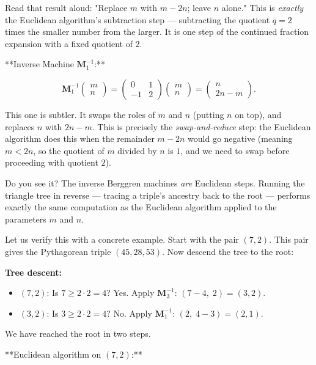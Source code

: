 Read that result aloud: "Replace $m$ with $m - 2n$; leave $n$ alone." This is \textit{exactly} the Euclidean algorithm's subtraction step --- subtracting the quotient $q = 2$ times the smaller number from the larger. It is one step of the continued fraction expansion with a fixed quotient of $2$.

**Inverse Machine $\mathbf{M}_1^{-1}$:**

\[
\mathbf{M}_1^{-1} \begin{pmatrix} m \\ n \end{pmatrix} = \begin{pmatrix} 0 & 1 \\ -1 & 2 \end{pmatrix} \begin{pmatrix} m \\ n \end{pmatrix} = \begin{pmatrix} n \\ 2n - m \end{pmatrix}.
\]

This one is subtler. It swaps the roles of $m$ and $n$ (putting $n$ on top), and replaces $n$ with $2n - m$. This is precisely the \textit{swap-and-reduce} step: the Euclidean algorithm does this when the remainder $m - 2n$ would go negative (meaning $m < 2n$, so the quotient of $m$ divided by $n$ is $1$, and we need to swap before proceeding with quotient $2$).

Do you see it? The inverse Berggren machines \textit{are} Euclidean steps. Running the triangle tree in reverse --- tracing a triple's ancestry back to the root --- performs exactly the same computation as the Euclidean algorithm applied to the parameters $m$ and $n$.

Let us verify this with a concrete example. Start with the pair $(7, 2)$. This pair gives the Pythagorean triple $(45, 28, 53)$. Now descend the tree to the root:

\textbf{Tree descent:}

\begin{itemize}
\item $(7, 2)$: Is $7 \ge 2 \cdot 2 = 4$? Yes. Apply $\mathbf{M}_3^{-1}$: $(7 - 4,\; 2) = (3, 2)$.
\item $(3, 2)$: Is $3 \ge 2 \cdot 2 = 4$? No. Apply $\mathbf{M}_1^{-1}$: $(2,\; 4 - 3) = (2, 1)$.
\end{itemize}
We have reached the root in two steps.

**Euclidean algorithm on $(7, 2)$:**

